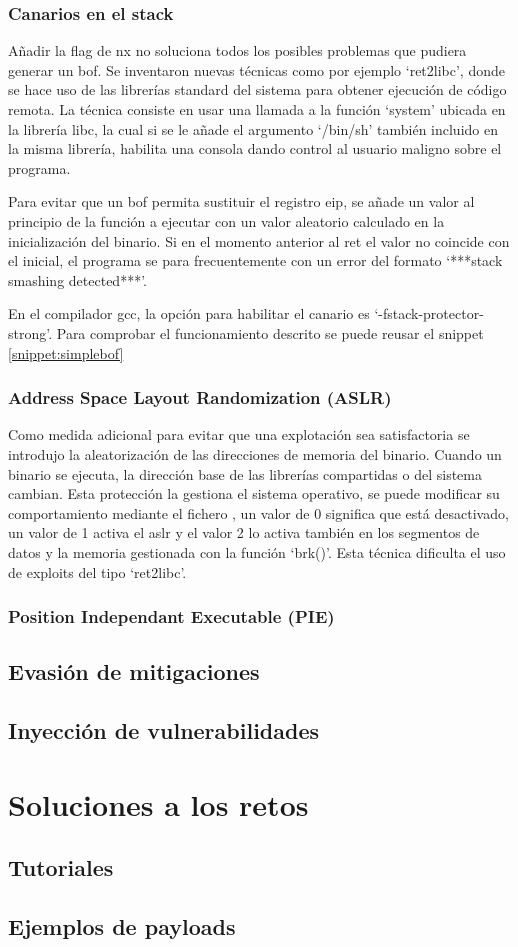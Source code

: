 \subsubsection{Canarios en el stack}
Añadir la flag de \acrshort{nx} no soluciona todos los posibles problemas que pudiera generar un \acrshort{bof}.
Se inventaron nuevas técnicas como por ejemplo `ret2libc', donde se hace uso de las librerías standard del sistema para obtener ejecución de código remota.
La técnica consiste en usar una llamada a la función `system' ubicada en la librería \acrshort{libc}, la cual si se le añade el argumento `/bin/sh' también incluido en la misma librería, habilita una consola dando control al usuario maligno sobre el programa.

Para evitar que un \acrshort{bof} permita sustituir el registro \acrshort{eip}, se añade un valor al principio de la función a ejecutar con un valor aleatorio calculado en la inicialización del binario.
Si en el momento anterior al \acrfull{ret} el valor no coincide con el inicial, el programa se para frecuentemente con un error del formato `***stack smashing detected***'.

En el compilador \acrshort{gcc}, la opción para habilitar el canario es `-fstack-protector-strong'.
Para comprobar el funcionamiento descrito se puede reusar el snippet \ref{snippet:simplebof}
\subsubsection{Address Space Layout Randomization (ASLR)}
Como medida adicional para evitar que una explotación sea satisfactoria se introdujo la aleatorización de las direcciones de memoria del binario.
Cuando un binario se ejecuta, la dirección base de las librerías compartidas o del sistema cambian.
Esta protección la gestiona el sistema operativo, se puede modificar su comportamiento mediante el fichero , un valor de 0 significa que está desactivado, un valor de 1 activa el \acrshort{aslr} y el valor 2 lo activa también en los segmentos de datos y la memoria gestionada con la función `brk()'.
Esta técnica dificulta el uso de exploits del tipo `ret2libc'.
\subsubsection{Position Independant Executable (PIE)}

\subsection{Evasión de mitigaciones}
\subsection{Inyección de vulnerabilidades} \label{subsec:vulns}
\section{Soluciones a los retos}
\subsection{Tutoriales}
\subsection{Ejemplos de payloads}